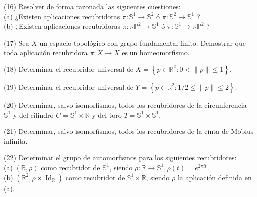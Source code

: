 \documentclass[
  a4paper,
  spanish,
  12pt,
]{scrartcl}
\begin{document}
\begin{ejer}
(16) Resolver de forma razonada las siguientes cuestiones:\\
(a) ¿Existen aplicaciones recubridoras $\pi: \mathbb{S}^{1} \rightarrow \mathbb{S}^{2}$ ó $\pi: \mathbb{S}^{2} \rightarrow \mathbb{S}^{1}$ ?\\
(b) ¿Existen aplicaciones recubridoras $\pi: \mathbb{R} \mathbb{P}^{2} \rightarrow \mathbb{S}^{1}$ ó $\pi: \mathbb{S}^{1} \rightarrow \mathbb{R} \mathbb{P}^{2}$ ?\\
\end{ejer}

\begin{ejer}
(17) Sea $X$ un espacio topológico con grupo fundamental finito. Demostrar que toda aplicación recubridora $\pi: X \rightarrow X$ es un homeomorfismo.\\
\end{ejer}

\begin{ejer}
(18) Determinar el recubridor universal de $X=\left\{p \in \mathbb{R}^{2}: 0<\|p\| \leq 1\right\}$.\\
\end{ejer}

\begin{ejer}
(19) Determinar el recubridor universal de $Y=\left\{p \in \mathbb{R}^{2}: 1 / 2 \leq\|p\| \leq 2\right\}$.\\
\end{ejer}

\begin{ejer}
(20) Determinar, salvo isomorfismos, todos los recubridores de la circunferencia $\mathbb{S}^{1}$ y del cilindro $C=\mathbb{S}^{1} \times \mathbb{R}$ y del toro $T=\mathbb{S}^{1} \times \mathbb{S}^{1}$.\\
\end{ejer}

\begin{ejer}
(21) Determinar, salvo isomorfismos, todos los recubridores de la cinta de Möbius infinita.\\
\end{ejer}

\begin{ejer}
(22) Determinar el grupo de automorfismos para los siguientes recubridores:\\
(a) $(\mathbb{R}, \rho)$ como recubridor de $\mathbb{S}^{1}$, siendo $\rho: \mathbb{R} \rightarrow \mathbb{S}^{1}, \rho(t)=e^{2 \pi i t}$.\\
(b) $\left(\mathbb{R}^{2}, \rho \times \operatorname{Id}_{\mathbb{R}}\right)$ como recubridor de $\mathbb{S}^{1} \times \mathbb{R}$, siendo $\rho$ la aplicación definida en (a).\\
\end{ejer}
\end{document}
